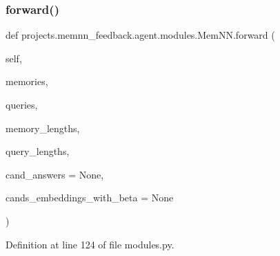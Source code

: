 \subsubsection{\texorpdfstring{forward()}{forward()}}
{\footnotesize\ttfamily def projects.\+memnn\+\_\+feedback.\+agent.\+modules.\+Mem\+N\+N.\+forward (\begin{DoxyParamCaption}\item[{}]{self,  }\item[{}]{memories,  }\item[{}]{queries,  }\item[{}]{memory\+\_\+lengths,  }\item[{}]{query\+\_\+lengths,  }\item[{}]{cand\+\_\+answers = {\ttfamily None},  }\item[{}]{cands\+\_\+embeddings\+\_\+with\+\_\+beta = {\ttfamily None} }\end{DoxyParamCaption})}



Definition at line 124 of file modules.\+py.


